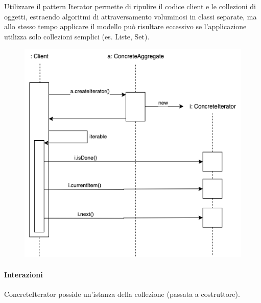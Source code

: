 Utilizzare il pattern Iterator permette di ripulire il codice client e le collezioni di oggetti, estraendo algoritmi di attraversamento voluminosi in classi separate, ma allo stesso tempo applicare il modello può risultare eccessivo se l'applicazione utilizza solo collezioni semplici (es. Liste, Set).

\begin{figure}[H]
    \centering
    \includegraphics[width=1\linewidth]{assets/pattern/iterator/iterator-activity.drawio.png}
\end{figure}

\paragraph{Interazioni} ConcreteIterator posside un'istanza della collezione (passata a costruttore).

\newpage